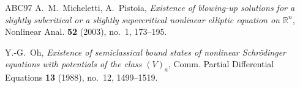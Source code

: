 \documentclass[12pt]{amsart}
\theoremstyle{plain}
\theoremstyle{definition}
\theoremstyle{remark}
\begin{document}
\begin{thebibliography}{ABC97}
A.~M.~Micheletti, A.~Pistoia,
\textit{Existence of blowing-up solutions for a slightly subcritical or a slightly supercritical nonlinear elliptic equation on $\mathbb{R}^{n}$},
Nonlinear Anal. \textbf{52} (2003), no.~1, 173--195.

Y.-G.~Oh,
\textit{Existence of semiclassical bound states of nonlinear Schr\"odinger
equations with potentials of the class $(V)_a$},
Comm. Partial Differential Equations \textbf{13} (1988), no.~12,
1499--1519.



\end{thebibliography}
\end{document}
